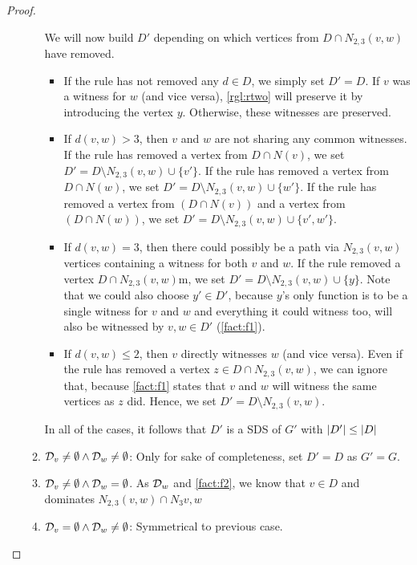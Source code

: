 \begin{proof}
\begin{enumerate}
\begin{enumerate}
            We will now build $D'$ depending on which vertices from $D \cap N_{2,3}(v,w)$ have removed. 
            \begin{itemize}
                \item If the rule has not removed any $d \in D$, we simply set $D' = D$. If $v$ was a witness for $w$ (and vice versa), \cref{rgl:rtwo} will preserve it by introducing the vertex $y$. Otherwise, these witnesses are preserved.
                \item If $d(v,w) > 3$, then $v$ and $w$ are not sharing any common witnesses. 
                If the rule has removed a vertex from $D \cap N(v)$, we set $D' = D \setminus N_{2,3}(v,w) \cup \{v'\}$.
                If the rule has removed a vertex from $D \cap N(w)$, we  set $D' = D \setminus N_{2,3}(v,w) \cup \{w'\}$.
                If the rule has removed a vertex from $(D \cap N(v))$ and a vertex from $(D \cap N(w))$, we set $D' = D \setminus N_{2,3}(v,w) \cup \{v', w'\}$.
                \item If $d(v,w) = 3$, then there could possibly be a path via $N_{2,3}(v,w) $ vertices containing a witness for both $v$ and $w$. If the rule removed a vertex $D \cap N_{2,3}(v, w)$m, we set $D' = D \setminus N_{2,3}(v,w) \cup \{y\}$. Note that we could also choose $y' \in D'$, because $y$'s only function is to be a single witness for $v$ and $w$ and everything it could witness too, will also be witnessed by $v,w \in D'$ (\cref{fact:f1}).
                \item If $d(v,w) \leq 2$, then $v$ directly witnesses $w$ (and vice versa). Even if the rule has removed a vertex $z \in D \cap N_{2,3}(v,w)$, we can ignore that, because \cref{fact:f1} states that $v$ and $w$ will witness the same vertices as $z$ did. Hence, we set $D' = D \setminus N_{2,3}(v,w)$.
            \end{itemize}
            In all of the cases, it follows that $D'$ is a SDS of $G'$ with $\abs{D'} \leq \abs{D}$ 
            
            \item  $ \mathcal{D}_{v} \neq \emptyset \wedge \mathcal{D}_{w} \neq \emptyset$: Only for sake of completeness, set $D' = D$ as $G' = G$.
            \item  $ \mathcal{D}_{v} \neq \emptyset  \wedge \mathcal{D}_{w} = \emptyset$. As $\mathcal{D}_{w}$ and \cref{fact:f2}, we know that $v \in D$ and dominates $N_{2,3}(v,w) \cap N_3{v,w }$
            \item  $ \mathcal{D}_{v} = \emptyset  \wedge \mathcal{D}_{w} \neq  \emptyset $: Symmetrical to previous case.
        \end{enumerate}


\end{enumerate}
\end{proof}
